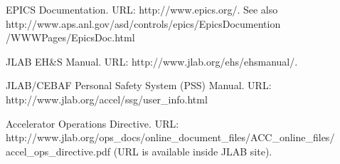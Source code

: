 \documentclass[11pt]{report}
\begin{document}
\begin{thebibliography}{99}
 EPICS Documentation. URL: http://www.epics.org/. See also http://www.aps.anl.gov/asd/controls/epics/EpicsDocumention\\/WWWPages/EpicsDoc.html

 JLAB EH\&S Manual. URL: http://www.jlab.org/ehs/ehsmanual/.

 JLAB/CEBAF Personal Safety System (PSS) Manual. URL: http://www.jlab.org/accel/ssg/user\_info.html

 Accelerator Operations Directive. URL: http://www.jlab.org/ops\_docs/online\_document\_files/ACC\_online\_files/\\accel\_ops\_directive.pdf (URL is available inside JLAB site). 

\end{thebibliography}
\end{document}
